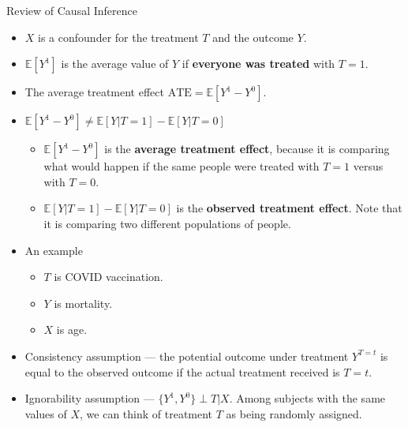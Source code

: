 \documentclass[20pt]{beamer}
\begin{document}
\begin{frame}{Review of Causal Inference}
  \begin{center}
  \end{center}

\begin{itemize}
\item $X$ is a confounder for the treatment $T$ and the outcome $Y$.


\item $\mathbb{E}[Y^1]$ is the average value of $Y$ if \textbf{everyone was treated} with $T=1$.

\item The average treatment effect $\text{ATE} = \mathbb{E}[Y^1 - Y^0]$.

\item $\mathbb{E}[Y^1 - Y^0] \neq \mathbb{E}[Y | T=1] - \mathbb{E}[Y | T=0]$

  \begin{itemize}
    \item $\mathbb{E}[Y^1 - Y^0]$ is the \textbf{average treatment effect}, because it is comparing what would happen if the same people were treated with $T=1$ versus with $T=0$.

    \item $\mathbb{E}[Y | T=1] - \mathbb{E}[Y | T=0]$ is the \textbf{observed treatment effect}. Note that it is comparing two different populations of people.

  \end{itemize}

\item An example
  \begin{itemize}
    \item $T$ is COVID vaccination.
    \item $Y$ is mortality.
    \item $X$ is age.
  \end{itemize}

\item Consistency assumption --- the potential outcome under treatment $Y^{T=t}$ is equal to the observed outcome if the actual treatment received is $T=t$.

\item Ignorability assumption --- $\{ Y^1, Y^0\} \perp T | X$. Among subjects with the same values of $X$, we can think of treatment $T$ as being randomly assigned.

\end{itemize}
\end{frame}
\end{document}
